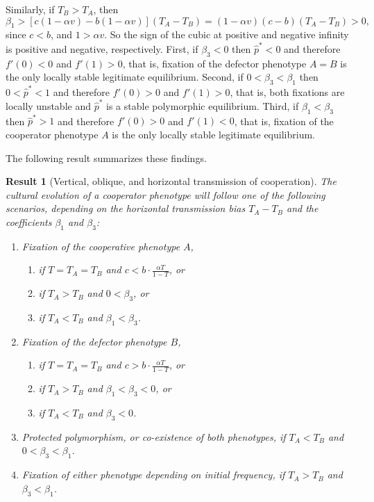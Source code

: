 \documentclass[12pt]{extarticle}
\newtheorem{result}{Result}
\begin{document}
Similarly, if $T_B>T_A$, then
\begin{equation} \label{eq:beta1_rev}
   \beta_1 > [c(1-\alpha v) - b(1-\alpha v)] (T_A-T_B) 
   = (1-\alpha v)(c-b)(T_A-T_B) > 0,
 \end{equation}
since $c<b$, and $1>\alpha v$. So the sign of the cubic at positive and negative infinity is positive and negative, respectively. 
First, if $\beta_3<0$ then $\hat{p}^*<0$ and therefore $f'(0)<0$ and $f'(1)>0$, that is, fixation of the defector phenotype $A=B$ is the only locally stable legitimate equilibrium.
Second, if $0<\beta_3<\beta_1$ then $0<\hat{p}^*<1$ and therefore $f'(0)>0$ and $f'(1)>0$, that is, both fixations are locally unstable and $\hat{p}^*$ is a stable polymorphic equilibrium.
Third, if $\beta_1<\beta_3$ then $\hat{p}^*>1$ and therefore $f'(0)>0$ and $f'(1)<0$, that is, fixation of the cooperator phenotype $A$ is the only locally stable legitimate equilibrium.

The following result summarizes these findings.

\begin{result}[Vertical, oblique, and horizontal transmission of cooperation]
The cultural evolution of a cooperator phenotype will follow one of the following scenarios, depending on the horizontal transmission bias $T_A-T_B$ and the coefficients $\beta_1$ and $\beta_3$:
\begin{enumerate}
\item \emph{Fixation of the cooperative phenotype $A$}, 
\begin{enumerate}
\item if $T=T_A=T_B$ and $c < b\cdot \frac{\alpha T}{1-T}$, or
\item if $T_A>T_B$ and $0<\beta_3$, or 
\item if $T_A<T_B$ and $\beta_1<\beta_3$.
\end{enumerate}

\item \emph{Fixation of the defector phenotype $B$}, 
\begin{enumerate}
\item if $T=T_A=T_B$ and $c > b\cdot \frac{\alpha T}{1-T}$, or 
\item if $T_A>T_B$ and $\beta_1<\beta_3<0$, or 
\item if $T_A<T_B$ and $\beta_3<0$.
\end{enumerate}

\item \emph{Protected polymorphism, or co-existence of both phenotypes}, if $T_A < T_B$ and $0<\beta_3<\beta_1$.

\item \emph{Fixation of either phenotype depending on initial frequency}, if $T_A>T_B$ and $\beta_3<\beta_1$.

\end{enumerate}
\end{result}
\end{document}
